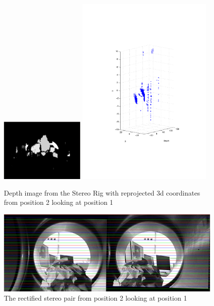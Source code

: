 \begin{figure}[htbp]
    \centering
    \includegraphics[width=0.37\textwidth]{pics/pos2-irregular-depth}
    \includegraphics[width=0.6\textwidth]{pics/pos2-irregular-3d}
    \caption{Depth image from the Stereo Rig with reprojected 3d coordinates from position
    2 looking at position 1}
    \label{chap7:fig-pos2-irregular-depth}
\end{figure}
\begin{figure}[htbp]
    \centering
    \includegraphics[width=\textwidth]{pics/pos2-irregular-rectified}
    \caption{The rectified stereo pair from position 2 looking at position 1 }
    \label{chap7:fig-pos2-irregular-rectified}
\end{figure}



